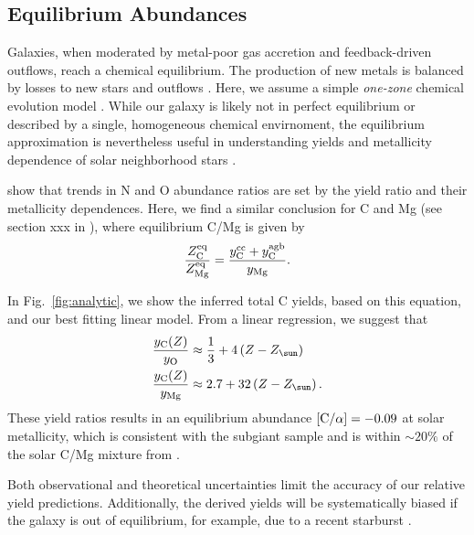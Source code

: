 \documentclass[fleqn,
usenatbib]{mnras}
\newcommand{\Yct}{\ensuremath{y_{\rm C}}}
\newcommand{\Ycc}{\ensuremath{y_{\rm C}^{\rm cc}}}
\newcommand{\Ycagb}{\ensuremath{y_{\rm C}^{\rm agb}}}
\newcommand{\Zo}{%
    \ifmmode Z_{\sun}%
    \else $Z_{\sun}$%
    \fi}
\newcommand{\about}[1]{${\sim} #1$}
\begin{document}
\subsection{Equilibrium Abundances}\label{sec:equilibrium}

Galaxies, when moderated by metal-poor gas accretion and feedback-driven outflows, reach a chemical equilibrium. The production of new metals is balanced by losses to new stars and outflows \citep{larson72, dalcanton07, FD08, PS11, lilly13}.
Here, we assume a simple \textit{one-zone} chemical evolution model \cite[e.g.][]{tinsley80, pagel09, matteucci21}.
While our galaxy is likely not in perfect equilibrium or described by a single, homogeneous chemical
envirnoment, the equilibrium approximation is nevertheless useful in understanding yields and
metallicity dependence of solar neighborhood stars \citep[e.g.][]{james_dwarf,james+23,WAF17}. 


\cite{james+23} show that trends in N and O abundance ratios are set by the yield ratio and their metallicity dependences. 
Here, we find a similar conclusion for C and Mg (see section xxx in \citealt{james+21}), where equilibrium C/Mg is given by
\begin{equation}\label{eq:equilibrium_yields}
    \frac{Z_{\rm C}^{\rm eq}}{Z_{\rm Mg}^{\rm eq}} = \frac{\Ycc + \Ycagb }{y_{\rm Mg}}.
\end{equation}

In Fig.~\ref{fig:analytic}, we show the inferred total C yields, based on this equation, and our best fitting linear model. From a linear regression, we suggest that
\begin{subequations}\label{eq:yc_inferred}
    \begin{align}
        \frac{\Yct(Z)}{y_{\rm O}} &\approx \frac{1}{3} + 4 \left(Z-\Zo\right) \\
        \frac{\Yct(Z)}{y_{\rm Mg}} &\approx 2.7 + 32 \left(Z-\Zo\right).
    \end{align}
\end{subequations}
These yield ratios results in an equilibrium abundance $[{\rm C}/\alpha] = -0.09$ at solar metallicity, which is consistent with the subgiant sample and is within \about{20\%} of the solar C/Mg mixture from \citet{asplund+09}.

Both observational and theoretical uncertainties limit the accuracy of our relative yield predictions.
Additionally, the derived yields will be systematically biased if the galaxy is out of equilibrium, for example, due to a recent starburst \citep{mor+19,isern19}. 
\end{document}

